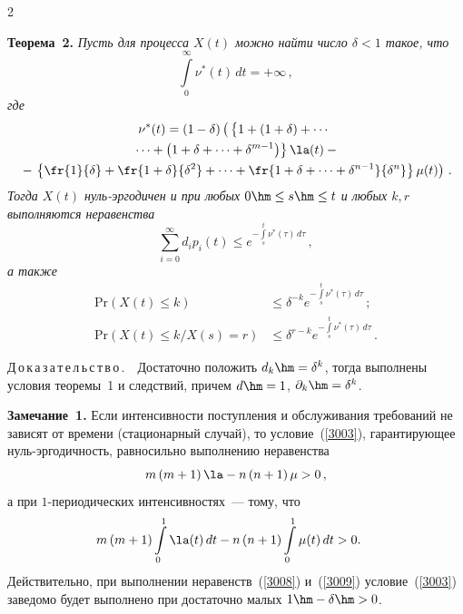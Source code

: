 \begin{multicols}{2}

\noindent
\textbf{Теорема~2.}
\textit{Пусть для процесса $X\left( t\right) $ можно найти число  $\delta < 1$ такое, что}
\begin{equation}
 \int\limits_{0}^{\infty} \nu^*(t) \, dt = + \infty\,,
\label{3003}
\end{equation}
\textit{где}
\begin{multline*}
\nu^*(t) =  \left( 1- \delta\right)\left(\vphantom{\fr{\delta^n}{\delta^n}}
\left\{ \vphantom{\delta^2} 1 + 
\left(1+\delta\right)+\cdots{}\right.\right.\\
\left.{}\cdots +\left(
1+\delta+ \cdots +\delta^{m-1}\right)\right\}\la(t) -{}\\  
{}- \left. \left\{\fr{1}{\delta} + \fr{1+\delta}{\delta^2}+
\dots+\fr{1+\delta+\dots+\delta^{n-1}}{\delta^n}\right\}\mu(t) \right)\,.
\end{multline*}
\textit{Тогда  $X\left( t\right) $ нуль-эр\-го\-ди\-чен и при любых $0 \hm\le s \hm\le t$ и 
любых $k, r$ выполняются неравенства}
\begin{equation*}
\sum_{i=0}^{\infty} d_i p_i (t) \le
e^{-\int\limits_s^t \nu^*(\tau) \, d\tau} \,,  
\end{equation*}
\textit{а также}
\begin{align*}
\mathrm{Pr} \left(X(t)  \le k \right) &\le \delta^{-k}e^{-\int\limits_s^t \nu^*(\tau) \, d\tau}\,;
\\
\mathrm{Pr} \left(X(t)  \le k / X(s) = r \right) &\le \delta^{r-k}e^{-\int\limits_s^t \nu^*(\tau) \, d\tau}\,.
\end{align*}


\noindent
Д\,о\,к\,а\,з\,а\,т\,е\,л\,ь\,с\,т\,в\,о\,.\ \ 
Достаточно положить $d_k \hm= \delta ^k$, тогда выполнены условия теоремы~1 и следствий, 
причем  ${d}\hm= 1$,  ${\partial}_k \hm= \delta ^{k}$.

\medskip

\noindent
\textbf{Замечание~1.}
Если интенсивности поступления и обслуживания требований не зависят от 
времени (стационарный случай), то условие~(\ref{3003}), гарантирующее 
нуль-эр\-го\-дич\-ность, равносильно выполнению неравенства
\begin{equation}
 m\left(m+1\right)\la - n\left(n+1\right)\mu > 0\,,
\label{3008}
\end{equation}
а при $1$-периодических интенсивностях~--- тому, что
\begin{equation}
\hspace*{-4mm}m\left(m+1\right)\int\limits_0^1\la(t) \, dt  - 
 n\left(n+1\right)\int\limits_0^1\mu(t) \, dt > 0.
\label{3009}
\end{equation}
Действительно, при выполнении неравенств~(\ref{3008}) и~(\ref{3009}) условие~(\ref{3003}) 
заведомо будет выполнено при достаточно малых $1\hm-\delta \hm>0$.


\end{multicols}
